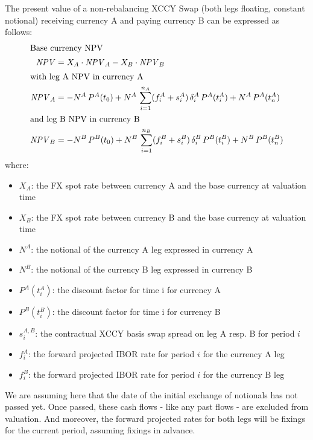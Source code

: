 \medskip
The present value  of a non-rebalancing XCCY Swap (both legs floating, constant 
notional) receiving currency A and paying currency B can be expressed as follows:
\begin{align*}
\intertext{Base currency NPV}
\mathit{NPV} &= X_A\cdot \mathit{NPV}_A - X_B\cdot \mathit{NPV}_B \\
\intertext{with leg A NPV in currency A}
\mathit{NPV}_{A} &= -N^{A} \,P^{A}(t_0) 
+ N^{A} \,\sum_{i=1}^{n_A} (f^A_i+s^A_i) \,\delta^A_i\,P^A(t_i^A) 
+ N^{A} \,P^A(t_n^{A}) \\
\intertext{and leg B NPV in currency B}
\mathit{NPV}_B &= - N^B\, P^B(t_0) + N^B \, \sum_{i=1}^{n_B} (f^B_i 
+ s^{B}_i)\,\delta^B_i\, P^B(t_i^B) + N^B \,P^B(t_n^B)
\end{align*}
where:
\begin{itemize}
\item $X_A$: the FX spot rate between currency A and the base currency at valuation time
\item $X_B$: the FX spot rate between currency B and the base currency at valuation time
\item $N^A$: the notional of the currency A leg expressed in currency A
\item $N^B$: the notional of the currency B leg expressed in currency B
\item $P^A(t_i^A)$:  the discount factor for time i for currency A
\item $P^B(t_i^B)$:  the discount factor for time i for currency B
\item $s^{A,B}_i$: the contractual XCCY basis swap spread on leg A resp. B for period $i$ 
\item $f^A_i$: the forward projected IBOR rate for period $i$ for the currency A leg
\item $f^B_i$: the forward projected IBOR rate for period $i$ for the currency B leg
\end{itemize}

We are assuming here that the date of the initial exchange of notionals has not passed yet.
Once passed, these cash flows - like any past flows - are excluded from valuation. 
And moreover, the forward projected rates for both legs will be fixings for the current 
period, assuming fixings in advance.

